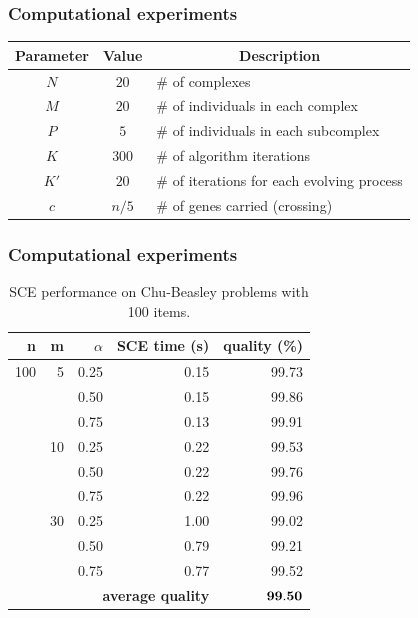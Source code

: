 \documentclass[10pt,fleqn]{beamer}
\newcommand{\spc}{\phantom{a}}
\begin{document}
\begin{frame}
	\frametitle{Computational experiments}
\begin{center}
  \begin{tabular}{c|c|l}
  \hline
  \multicolumn{1}{c}{\rule{0pt}{12pt} \bf Parameter \spc } & \multicolumn{1}{|c|}{\bf \spc Value \spc } & \multicolumn{1}{c}{\bf Description} \\[2pt]
  \hline\rule{0pt}{12pt}
  $N$  & $20$  & \spc \# of complexes \\
  $M$  & $20$  & \spc \# of individuals in each complex \\
  $P$  & $5$   & \spc \# of individuals in each subcomplex \\
  $K$  & $300$ & \spc \# of algorithm iterations \\
  $K'$ & $20$  & \spc \# of iterations for each evolving process \\
  $c$  & $n/5$ & \spc \# of genes carried (crossing) \\[2pt]
  \hline
  \end{tabular}
\end{center}
\end{frame}

\begin{frame}
	\frametitle{Computational experiments}
\begin{table}
{
\renewcommand{\arraystretch}{1.5}%
\fontsize{8.5pt}{1em}\selectfont 
\begin{center}
\begin{tabular}{|r|r|r|rr|} \hline
\textbf{n}   & \textbf{m}  & \textbf{$\alpha$} & \textbf{SCE time (s)} & \textbf{quality (\%)} \\ \hline
100 &  5 & 0.25 & 0.15 & 99.73 \\
    &    & 0.50 & 0.15 & 99.86 \\
    &    & 0.75 & 0.13 & 99.91 \\ \cline{2-5}
    & 10 & 0.25 & 0.22 & 99.53 \\
    &    & 0.50 & 0.22 & 99.76 \\
    &    & 0.75 & 0.22 & 99.96 \\ \cline{2-5}
    & 30 & 0.25 & 1.00 & 99.02 \\
    &    & 0.50 & 0.79 & 99.21 \\
    &    & 0.75 & 0.77 & 99.52 \\ \hline
    & \multicolumn{3}{r}{\textbf{average quality}}  & $\bf 99.50$  \\ \hline
\end{tabular}
\end{center}
}
 \caption{SCE performance on Chu-Beasley problems with 100 items.}
\end{table}
\end{frame}
\end{document}
